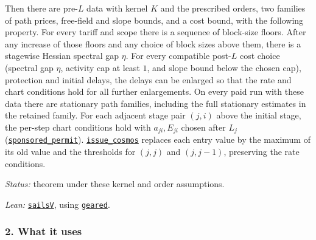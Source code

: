 \documentclass[
  letterpaper,
  11pt]{article}
\begin{document}
Then there are pre-\(L\) data with kernel \(K\) and the prescribed
orders, two families of path prices, free-field and slope bounds, and a
cost bound, with the following property. For every tariff and scope
there is a sequence of block-size floors. After any increase of those
floors and any choice of block sizes above them, there is a stagewise
Hessian spectral gap \(\eta\). For every compatible post-\(L\) cost
choice (spectral gap \(\eta\), activity cap at least \(1\), and slope
bound below the chosen cap), protection and initial delays, the delays
can be enlarged so that the rate and chart conditions hold for all
further enlargements. On every paid run with these data there are
stationary path families, including the full stationary estimates in the
retained family. For each adjacent stage pair \((j,i)\) above the
initial stage, the per-step chart conditions hold with \(a_{ji},E_{ji}\)
chosen after \(L_j\)
(\href{https://github.com/yang-mills-group/OpenAI-YM-20261028/blob/3456e5e75cf8d4cd558955a5c7638fba2d68f464/YM/SectorNext/GAUSSIAN_SECTOR_CHANGE/Stamped.lean\#L139-L168}{\texttt{sponsored\_permit}}).
\href{https://github.com/yang-mills-group/OpenAI-YM-20261028/blob/3456e5e75cf8d4cd558955a5c7638fba2d68f464/YM/SectorNext/GAUSSIAN_SECTOR_CHANGE/Handoff.lean\#L99-L116}{\texttt{issue\_cosmos}}
replaces each entry value by the maximum of its old value and the
thresholds for \((j,j)\) and \((j,j-1)\), preserving the rate
conditions.

\emph{Status:} theorem under these kernel and order assumptions.

\emph{Lean:}
\href{https://github.com/yang-mills-group/OpenAI-YM-20261028/blob/3456e5e75cf8d4cd558955a5c7638fba2d68f464/YM/MergeProof/Seaside.lean\#L96-L154}{\texttt{sailsV}},
using
\href{https://github.com/yang-mills-group/OpenAI-YM-20261028/blob/3456e5e75cf8d4cd558955a5c7638fba2d68f464/YM/Next/STATIONARY/FullPlanned.lean\#L59-L66}{\texttt{geared}}.

\subsubsection{2. What it uses}\label{what-it-uses-6}
\end{document}
